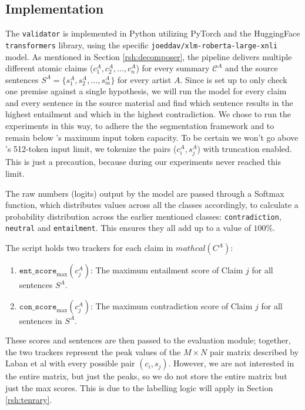 \subsection{\rob Implementation}
The \texttt{validator} is implemented in Python utilizing PyTorch and the HuggingFace \\ \texttt{transformers} library, using the specific \texttt{joeddav/xlm-roberta-large-xnli} model. 
\noindent As mentioned in Section \ref{rsh:decomposer}, the pipeline delivers multiple different atomic claims ($c^A_1, c^A_2, \dots, c^A_n$) for every summary $\mathcal{C}^A$ and the source sentences $S^A = \{s^A_1, s^A_2, \dots, s^A_m\}$ for every artist $A$. Since \rob is set up to only check one premise against a single hypothesis, we will run the model for every claim and every sentence in the source material and find which sentence results in the highest entailment and which in the highest contradiction. We chose to run the experiments in this way, to adhere the the segmentation framework \cite{laban2021summaC} and to remain below \rob's maximum input token capacity. To be certain we won't go above \rob's 512-token input limit, we tokenize the pairs ($c^A_i, s^A_j$) with truncation enabled. This is just a precaution, because during our experiments \rob never reached this limit. 

The raw numbers (logits) output by the model are passed through a Softmax function, which distributes values across all the classes accordingly, to calculate a probability distribution across the earlier mentioned classes: \texttt{contradiction}, \texttt{neutral} and \texttt{entailment}. This ensures they all add up to a value of $100\%$.

The script holds two trackers for each claim in $mathcal(C^A)$:
\begin{enumerate}
    \item $\texttt{ent\_score}_{\text{max}}(c^A_j)$: The maximum entailment score of Claim $j$ for all sentences $S^A$. 
    \item $\texttt{con\_score}_{\text{max}}(c^A_j)$: The maximum contradiction score of Claim $j$ for all sentences in $S^A$. 
\end{enumerate}

\noindent These scores and sentences are then passed to the evaluation module; together, the two trackers represent the peak values of the $M \times N$ pair matrix described by Laban et al \cite{laban2021summaC} with every possible pair $(c_i, s_j)$. However, we are not interested in the entire matrix, but just the peaks, so we do not store the entire matrix but just the max scores. This is due to the labelling logic will apply in Section \ref{rsh:tenrary}. 

